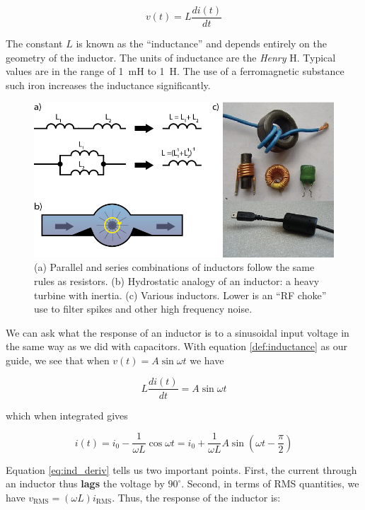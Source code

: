 \documentclass{tufte-book}
\begin{document}
\begin{equation}\label{def:inductance}
v(t) = L\frac{di(t)}{dt}
\end{equation}

\noindent The constant $L$ is known as the ``inductance'' and depends entirely on the geometry of the inductor. The units of inductance are the \textit{Henry} H. Typical values are in the range of 1~mH to 1~H. The use of a ferromagnetic substance such iron increases the inductance significantly.

\begin{figure}[h]
\caption{(a) Parallel and series combinations of inductors follow the same rules as resistors. (b) Hydrostatic analogy of an inductor: a heavy turbine with inertia. (c) Various inductors. Lower is an ``RF choke'' use to filter spikes and other high frequency noise.}
\label{fig:inductors}
\begin{center}
\includegraphics[width=\textwidth]{inductee.png}
\end{center}
\end{figure}

We can ask what the response of an inductor is to a sinusoidal input voltage in the same way as we did with capacitors. With equation \ref{def:inductance} as our guide, we see that when $v(t) = A\sin\omega t$ we have

$$
L\frac{di(t)}{dt} = A\sin\omega t
$$

\noindent which when integrated gives

\begin{equation}\label{eq:ind_deriv}
i(t) = i_0 -\frac{1}{\omega L}\cos\omega t = i_0 +\frac{1}{\omega L}A\sin\left(\omega t  -\frac{\pi}{2}\right)
\end{equation}

\noindent Equation \ref{eq:ind_deriv} tells us two important points. First, the current through an inductor thus \textbf{lags} the voltage by $90^\circ$. Second, in terms of RMS quantities, we have $v_\text{RMS} = \left(\omega L\right)i_\text{RMS}$. Thus, the response of the inductor is:
\end{document}

